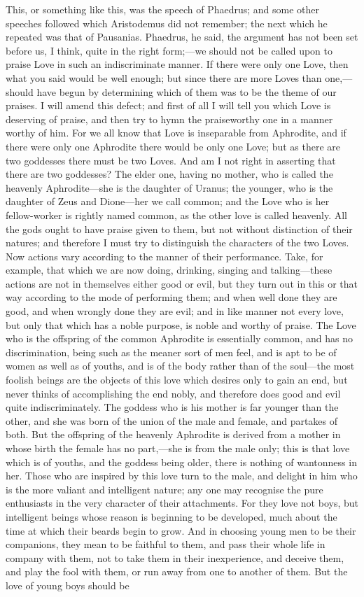 \para[54] This, or something like this, was the speech of Phaedrus; and some other speeches followed which Aristodemus did not remember; the next which he repeated was that of Pausanias. Phaedrus, he said, the argument has not been set before us, I think, quite in the right form;---we should not be called upon to praise Love in such an indiscriminate manner. If there were only one Love, then what you said would be well enough; but since there are more Loves than one,---should have begun by determining which of them was to be the theme of our praises. I will amend this defect; and first of all I will tell you which Love is deserving of praise, and then try to hymn the praiseworthy one in a manner worthy of him. For we all know that Love is inseparable from Aphrodite, and if there were only one Aphrodite there would be only one Love; but as there are two goddesses there must be two Loves. And am I not right in asserting that there are two goddesses? The elder one, having no mother, who is called the heavenly Aphrodite---she is the daughter of Uranus; the younger, who is the daughter of Zeus and Dione---her we call common; and the Love who is her fellow-worker is rightly named common, as the other love is called heavenly. All the gods ought to have praise given to them, but not without distinction of their natures; and therefore I must try to distinguish the characters of the two Loves. Now actions vary according to the manner of their performance. Take, for example, that which we are now doing, drinking, singing and talking---these actions are not in themselves either good or evil, but they turn out in this or that way according to the mode of performing them; and when well done they are good, and when wrongly done they are evil; and in like manner not every love, but only that which has a noble purpose, is noble and worthy of praise. The Love who is the offspring of the common Aphrodite is essentially common, and has no discrimination, being such as the meaner sort of men feel, and is apt to be of women as well as of youths, and is of the body rather than of the soul---the most foolish beings are the objects of this love which desires only to gain an end, but never thinks of accomplishing the end nobly, and therefore does good and evil quite indiscriminately. The goddess who is his mother is far younger than the other, and she was born of the union of the male and female, and partakes of both. But the offspring of the heavenly Aphrodite is derived from a mother in whose birth the female has no part,---she is from the male only; this is that love which is of youths, and the goddess being older, there is nothing of wantonness in her. Those who are inspired by this love turn to the male, and delight in him who is the more valiant and intelligent nature; any one may recognise the pure enthusiasts in the very character of their attachments. For they love not boys, but intelligent beings whose reason is beginning to be developed, much about the time at which their beards begin to grow. And in choosing young men to be their companions, they mean to be faithful to them, and pass their whole life in company with them, not to take them in their inexperience, and deceive them, and play the fool with them, or run away from one to another of them. But the love of young boys should be 
